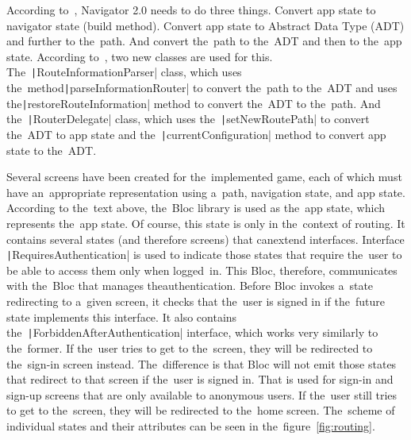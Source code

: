 According to~\cite{kietay_2021_navigator}, Navigator 2.0 needs to do three things.
Convert app state to navigator state (build method).
Convert app state to Abstract Data Type (ADT) and further to the~path.
And convert the~path to the~ADT and then to the~app state.
According to~\cite{ryan_2020_navigator}, two new classes are used for this.
The~\texttt|RouteInformationParser| class, which uses the~method\linebreak{}\texttt|parseInformationRouter| to convert the~path to the~ADT and uses the\linebreak{}\texttt|restoreRouteInformation| method to convert the~ADT to the~path.
\linebreak
And the~\texttt|RouterDelegate| class, which uses the~\texttt|setNewRoutePath| to convert the~ADT to app state and the~\texttt|currentConfiguration| method to convert app state to the~ADT.

Several screens have been created for the~implemented game, each of which must have an~appropriate representation using a~path, navigation state, and app state.
According to the~text above, the~Bloc library is used as the~app state, which represents the~app state.
Of course, this state is only in the~context of routing.
It contains several states (and therefore screens) that can\linebreak{}extend interfaces.
Interface \texttt|RequiresAuthentication| is used to indicate those states that require the~user to be able to access them only when logged~in.
This Bloc, therefore, communicates with the~Bloc that manages the\linebreak{}authentication.
Before Bloc invokes a~state redirecting to a~given screen, it checks that the~user is signed in if the~future state implements this interface.
It also contains the~\texttt|ForbiddenAfterAuthentication| interface, which works very similarly to the~former.
If the~user tries to get to the~screen, they will be redirected to the~sign-in screen instead.
The~difference is that Bloc will not emit those states that redirect to that screen if the~user is signed in.
That is used for sign-in and sign-up screens that are only available to anonymous users.
If the~user still tries to get to the~screen, they will be redirected to the~home screen.
The~scheme of individual states and their attributes can be seen in the~figure~\ref{fig:routing}.

